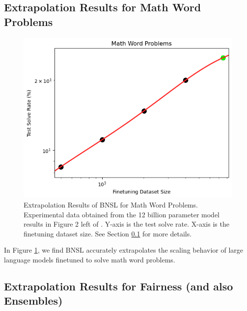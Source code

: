 \documentclass{article} %
\begin{document}

\clearpage

\subsection{Extrapolation Results for Math Word Problems}
\label{section:math_word_problems}

\begin{figure}[htbp]
    \centering
\includegraphics[width=1.0\textwidth]{figures/math_word_problems/dataset_size__12b_params.png}
    \caption{
Extrapolation Results of BNSL for Math Word Problems. Experimental data obtained from the 12 billion parameter model results in Figure 2 left of \cite{cobbe2021training}. Y-axis is the test solve rate. X-axis is the finetuning dataset size. See Section \ref{section:math_word_problems} for more details.
    }
    \label{fig:math_word_problems}
\end{figure}

In Figure \ref{fig:math_word_problems}, we find BNSL accurately extrapolates the scaling behavior of large language models finetuned to solve math word problems.



\clearpage

\subsection{Extrapolation Results for Fairness (and also Ensembles)}
\label{section:fairness}
\end{document}
